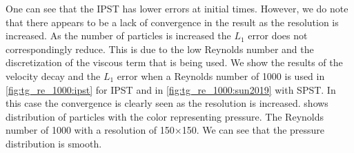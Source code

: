 One can see that the IPST has lower errors at initial times. However,
we do note that there appears to be a lack of convergence in the result as the
resolution is increased. As the number of particles is increased the $L_1$
error does not correspondingly reduce. This is due to the low Reynolds number
and the discretization of the viscous term that is being used. We show the
results of the velocity decay and the $L_1$ error when a Reynolds number of
1000 is used in \cref{fig:tg_re_1000:ipst} for IPST and in
\cref{fig:tg_re_1000:sun2019} with SPST. In this case the convergence
is clearly seen as the resolution is increased. 
shows distribution of particles with the color representing pressure. The
Reynolds number of 1000 with a resolution of 150$\times$150. We can see
that the pressure distribution is smooth.

